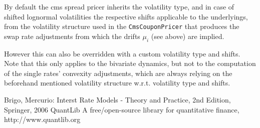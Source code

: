 \documentclass{amsart}
\theoremstyle{plain}
\numberwithin{equation}{section}
\begin{document}
By default the cms spread pricer inherits the volatility type, and in case of shifted lognormal volatilities the respective shifts applicable to the underlyings,  from the volatility structure used in the \verb+CmsCouponPricer+ that produces the swap rate adjustments from which the drifts $\mu_i$ (see above) are implied.

However this can also be overridden with a custom volatility type and shifts. Note that this only applies to the bivariate dynamics, but not to the computation of the single rates' convexity adjustments, which are always relying on the beforehand mentioned volatility structure w.r.t. volatility type and shifts.

\begin{thebibliography}{1}
Brigo, Mercurio: Interst Rate Models - Theory and Practice, 2nd Edition, Springer, 2006
QuantLib A free/open-source library for quantitative finance, http://www.quantlib.org
\end{thebibliography}
\end{document}
